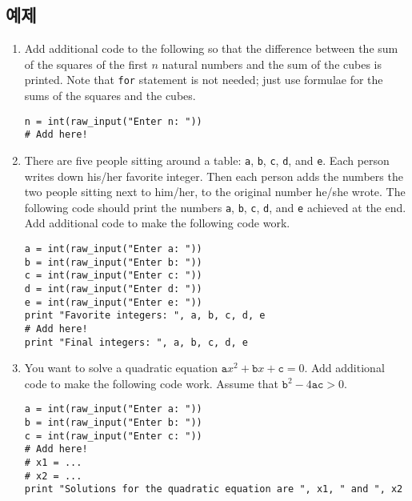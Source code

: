 \documentclass[../main.tex]{subfiles}
\begin{document}
\subsection{예제}
\begin{enumerate}
\item Add additional code to the following so that the difference between the sum of the squares of the first $n$ natural numbers and the sum of the cubes is printed.
Note that \texttt{for} statement is not needed; just use formulae for the sums of the squares and the cubes.
\begin{verbatim}
n = int(raw_input("Enter n: "))
# Add here!
\end{verbatim}

\item There are five people sitting around a table: \texttt{a}, \texttt{b}, \texttt{c}, \texttt{d}, and \texttt{e}.
Each person writes down his/her favorite integer.
Then each person adds the numbers the two people sitting next to him/her, to the original number he/she wrote.
The following code should print the numbers \texttt{a}, \texttt{b}, \texttt{c}, \texttt{d}, and \texttt{e} achieved at the end.
Add additional code to make the following code work.
\begin{verbatim}
a = int(raw_input("Enter a: "))
b = int(raw_input("Enter b: "))
c = int(raw_input("Enter c: "))
d = int(raw_input("Enter d: "))
e = int(raw_input("Enter e: "))
print "Favorite integers: ", a, b, c, d, e
# Add here!
print "Final integers: ", a, b, c, d, e
\end{verbatim}

\item You want to solve a quadratic equation $\texttt{a}x^2 + \texttt{b}x + \texttt{c} = 0$.
Add additional code to make the following code work.
Assume that $\texttt{b}^2 - 4\texttt{ac} > 0$.
\begin{verbatim}
a = int(raw_input("Enter a: "))
b = int(raw_input("Enter b: "))
c = int(raw_input("Enter c: "))
# Add here!
# x1 = ...
# x2 = ...
print "Solutions for the quadratic equation are ", x1, " and ", x2
\end{verbatim}


\end{enumerate}
\end{document}
